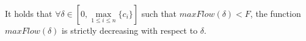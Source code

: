 \begin{lemma} \ \\
  \label{maxflowdec}
  It holds that $\forall \delta \in \left[0, \max\limits_{1 \leq i \leq n}{\{c_i\}}\right]$ such that
  $maxFlow\left(\delta\right) < F$, the function $maxFlow\left(\delta\right)$ is strictly decreasing with respect to
  $\delta$.
\end{lemma}
